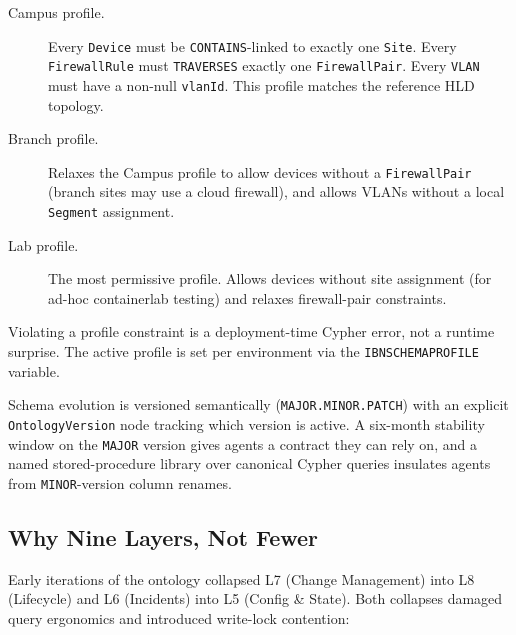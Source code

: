 \documentclass[acmtog]{acmart}
\renewcommand\_{\textunderscore\allowbreak}
\begin{document}
\begin{description}
  \item[Campus profile.] Every \texttt{Device} must be
    \texttt{CONTAINS}-linked to exactly one \texttt{Site}. Every
    \texttt{FirewallRule} must \texttt{TRAVERSES} exactly one
    \texttt{FirewallPair}. Every \texttt{VLAN} must have a
    non-null \texttt{vlanId}. This profile matches the reference
    HLD topology.

  \item[Branch profile.] Relaxes the Campus profile to allow
    devices without a \texttt{FirewallPair} (branch sites may
    use a cloud firewall), and allows VLANs without a local
    \texttt{Segment} assignment.

  \item[Lab profile.] The most permissive profile. Allows
    devices without site assignment (for ad-hoc containerlab
    testing) and relaxes firewall-pair constraints.
\end{description}

Violating a profile constraint is a deployment-time Cypher error,
not a runtime surprise. The active profile is set per environment
via the \texttt{IBN\_SCHEMA\_PROFILE} variable.

Schema evolution is versioned semantically
(\texttt{MAJOR.MINOR.PATCH}) with an explicit
\texttt{OntologyVersion} node tracking which version is active. A
six-month stability window on the \texttt{MAJOR} version gives
agents a contract they can rely on, and a named stored-procedure
library over canonical Cypher queries insulates agents from
\texttt{MINOR}-version column renames.


\subsection{Why Nine Layers, Not Fewer}\label{sec:ssot:why}

Early iterations of the ontology collapsed L7 (Change Management)
into L8 (Lifecycle) and L6 (Incidents) into L5 (Config \& State).
Both collapses damaged query ergonomics and introduced write-lock
contention:
\end{document}
